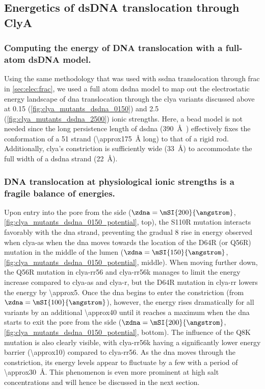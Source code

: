 %
\subsection{Energetics of {dsDNA} translocation through {ClyA}}
%
\label{sec:elec:clya:dna}

\subsubsection{Computing the energy of DNA translocation with a full-atom {dsDNA} model.}
%

Using the same methodology that was used with \gls{ssdna} translocation through \gls{frac} in
\cref{sec:elec:frac}, we used a full atom \gls{dsdna} model to map out the electrostatic energy landscape of
\gls{dna} translocation through the \gls{clya} variants discussed above at \SI{0.15}{\Molar}
(\cref{fig:clya_mutants_dsdna_0150}) and \SI{2.5}{\Molar} (\cref{fig:clya_mutants_dsdna_2500}) ionic
strengths. Here, a bead model is not needed since the long persistence length of \gls{dsdna}
(\SI{390}{\angstrom}~\cite{Gross-2011}) effectively fixes the conformation of a \SI{51}{\bp} strand
(\SI{\approx175}{\angstrom} long) to that of a rigid rod. Additionally, \gls{clya}'s \transi{} constriction is
sufficiently wide (\SI{33}{\angstrom}) to accommodate the full width of a \gls{dsdna} strand
(\SI{22}{\angstrom}).

\subsubsection{DNA translocation at physiological ionic strengths is a fragile balance of energies.}
%

Upon entry into the pore from the \cisi{} side ($\zdna = \mSI{200}{\angstrom}$,
\cref{fig:clya_mutants_dsdna_0150_potential}, top), the S110R mutation interacts favorably with the \gls{dna}
strand, preventing the gradual \SI{+8}{\kT} rise in energy observed when \gls{clya-as} when the \gls{dna}
moves towards the location of the  D64R (or Q56R) mutation in the middle of the lumen ($\zdna =
\mSI{150}{\angstrom}$, \cref{fig:clya_mutants_dsdna_0150_potential}, middle). When moving further down, the
Q56R mutation in \gls{clya-rr56} and \gls{clya-rr56k} manages to limit the energy increase compared to
\gls{clya-as} and \gls{clya-r}, but the D64R mutation in \gls{clya-rr} lowers the energy by
\SI{\approx5}{\kT}. Once the \gls{dna} begins to enter the constriction (from $\zdna = \mSI{100}{\angstrom}$),
however, the energy rises dramatically for all variants by an additional \SI{\approx40}{\kT} until it reaches
a maximum when the \gls{dna} starts to exit the pore from the \transi{} side ($\zdna = \mSI{200}{\angstrom}$,
\cref{fig:clya_mutants_dsdna_0150_potential}, bottom). The influence of the Q8K mutation is also clearly
visible, with \gls{clya-rr56k} having a significantly lower energy barrier (\SI{\approx10}{\kT}) compared to
\gls{clya-rr56}. As the \gls{dna} moves through the constriction, its energy levels appear to fluctuate by a
few \si{\kT} with a period of \SI{\approx30}{\angstrom}. This phenomenon is even more prominent at high salt
concentrations and will hence be discussed in the next section. 


